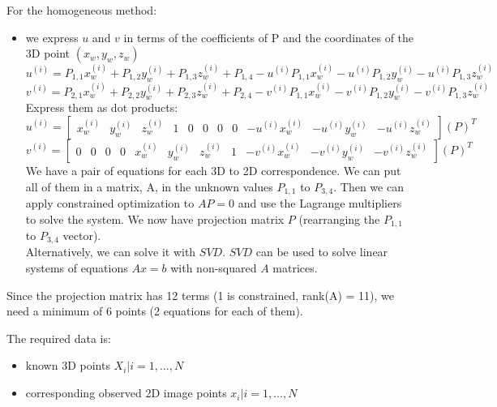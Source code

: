 \documentclass{article}
\begin{document}
\begin{itemize}
    For the homogeneous method:
    \begin{itemize}
        \item we express $u$ and $v$ in terms of the coefficients of P and the coordinates of the 3D point $(x_w, y_w, z_w)$
        \begin{equation*}
            u^{(i)} = P_{1,1}x_w^{(i)} + P_{1,2}y_w^{(i)} + P_{1,3}z_w^{(i)} + P_{1,4} - u^{(i)}P_{1,1}x_w^{(i)} - u^{(i)}P_{1,2}y_w^{(i)} - u^{(i)}P_{1,3}z_w^{(i)}
        \end{equation*}
        \begin{equation*}
            v^{(i)} = P_{2,1}x_w^{(i)} + P_{2,2}y_w^{(i)} + P_{2,3}z_w^{(i)} + P_{2,4} - v^{(i)}P_{1,1}x_w^{(i)} - v^{(i)}P_{1,2}y_w^{(i)} - v^{(i)}P_{1,3}z_w^{(i)}
        \end{equation*}
        Express them as dot products:
        \begin{equation*}
            u^{(i)} = 
            \begin{bmatrix}
                x_w^{(i)} & y_w^{(i)} & z_w^{(i)} & 1 & 0 & 0 & 0 & 0 & -u^{(i)}x_w^{(i)} & -u^{(i)}y_w^{(i)} & -u^{(i)}z_w^{(i)}
            \end{bmatrix}
            (P)^T
        \end{equation*}
        \begin{equation*}
            v^{(i)} = 
            \begin{bmatrix}
                0 & 0 & 0 & 0 & x_w^{(i)} & y_w^{(i)} & z_w^{(i)} & 1 & -v^{(i)}x_w^{(i)} & -v^{(i)}y_w^{(i)} & -v^{(i)}z_w^{(i)}
            \end{bmatrix}
            (P)^T
        \end{equation*}
        We have a pair of equations for each 3D to 2D correspondence. We can put all of them in a matrix, A, in the unknown values $P_{1,1}$ to $P_{3,4}$.
        Then we can apply constrained optimization to $AP = 0$ and use the Lagrange multipliers to solve the system. We now have projection matrix $P$ (rearranging the $P_{1,1}$ to $P_{3,4}$ vector). \\

        Alternatively, we can solve it with $SVD$. $SVD$ can be used to solve linear systems of equations $Ax=b$ with non-squared $A$ matrices.
    \end{itemize}

    Since the projection matrix has 12 terms (1 is constrained, rank(A) = 11), we need a minimum of 6 points (2 equations for each of them).

\end{itemize}

The required data is:
\begin{itemize}
    \item known 3D points {$X_i | i = 1, ..., N$}
    \item corresponding observed 2D image points {$x_i | i = 1, ..., N$}
\end{itemize}
\end{document}
